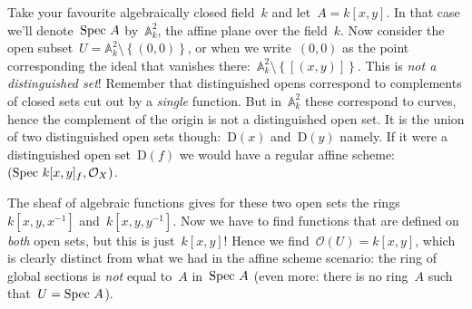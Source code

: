 \begin{example}
  Take your favourite algebraically closed field~$k$ and let~$A=k[x,y]$. In that case we'll denote~$\operatorname{Spec\,} A$ by~$\mathbb{A}^2_k$, the affine plane over the field~$k$. Now consider the open subset~$U=\mathbb{A}^2_k\setminus\left\{ (0,0) \right\}$, or when we write~$(0,0)$ as the point corresponding the ideal that vanishes there:~$\mathbb{A}^2_k\setminus\left\{ \left[ (x,y) \right] \right\}$. This is \emph{not a distinguished set}! Remember that distinguished opens correspond to complements of closed sets cut out by a \emph{single} function. But in~$\mathbb{A}^2_k$ these correspond to curves, hence the complement of the origin is not a distinguished open set. It is the union of two distinguished open sets though:~$\mathrm{D}(x)$ and~$\mathrm{D}(y)$ namely. If it were a distinguished open set~$\mathrm{D}(f)$ we would have a regular affine scheme: $(\operatorname{Spec\,} k[x,y]_f,\mathcal{O}_X)$.

  The sheaf of algebraic functions gives for these two open sets the rings~$k[x,y,x^{-1}]$ and~$k[x,y,y^{-1}]$. Now we have to find functions that are defined on \emph{both} open sets, but this is just~$k[x,y]$! Hence we find~$\mathcal{O}(U)=k[x,y]$, which is clearly distinct from what we had in the affine scheme scenario: the ring of global sections is \emph{not} equal to~$A$ in~$\operatorname{Spec\,} A$ (even more: there is no ring~$A$ such that~$U=\operatorname{Spec\,} A$).
\end{example}

